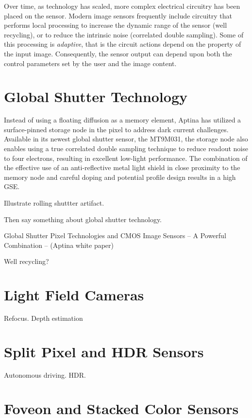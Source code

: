 \documentclass[
  letterpaper,
]{book}
\begin{document}
Over time, as technology has scaled, more complex electrical circuitry
has been placed on the sensor. Modern image sensors frequently include
circuitry that performs local processing to increase the dynamic range
of the sensor (well recycling), or to reduce the intrinsic noise
(correlated double sampling). Some of this processing is
\emph{adaptive}, that is the circuit actions depend on the property of
the input image. Consequently, the sensor output can depend upon both
the control parameters set by the user and the image content.

\section{Global Shutter Technology}\label{sec-sensor-globalshutter}

Instead of using a floating diffusion as a memory element, Aptina has
utilized a surface-pinned storage node in the pixel to address dark
current challenges. Available in its newest global shutter sensor, the
MT9M031, the storage node also enables using a true correlated double
sampling technique to reduce readout noise to four electrons, resulting
in excellent low-light performance. The combination of the effective use
of an anti-reflective metal light shield in close proximity to the
memory node and careful doping and potential profile design results in a
high GSE.

Illustrate rolling shuttter artifact.

Then say something about global shutter technology.

Global Shutter Pixel Technologies and CMOS Image Sensors -- A Powerful
Combination -- (Aptina white paper)

Well recycling?

\section{Light Field Cameras}\label{sec-sensor-lightfield}

Refocus. Depth estimation

\section{Split Pixel and HDR Sensors}\label{sec-sensor-splitpixel}

Autonomous driving. HDR.

\section{Foveon and Stacked Color Sensors}\label{sec-sensor-foveon}
\end{document}
